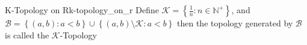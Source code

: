 \begin{definition}{K-Topology on R}{k-topology_on_r}
    Define $ \mathcal{ K }  = \left\{ \frac{1}{n}: n \in  \mathbb{N} ^{ + }
    \right\}  $, and $ \mathcal{ B } =  \left\{ \left( a, b \right): a < b
    \right\} \cup \left\{ \left( a, b \right) \setminus \mathcal{ K } : a < b
    \right\}$ then the topology generated by $ \mathcal{ B }  $ is called the
    \( \mathcal{ K }   \)-Topology
\end{definition}
